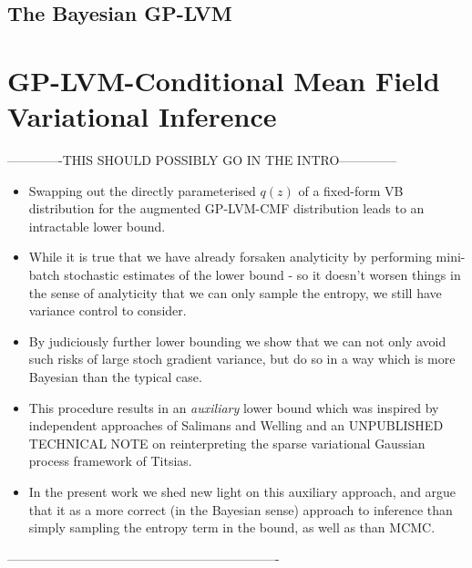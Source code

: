 \documentclass{article}
\begin{document}
\subsection{The Bayesian GP-LVM}
\label{subsec:gplvm}

\section{GP-LVM-Conditional Mean Field Variational Inference} %
\label{sec:gplvmcmf}

-------------THIS SHOULD POSSIBLY GO IN THE INTRO--------------

\begin{itemize}
  \item Swapping out the directly parameterised $q(z)$ of a fixed-form VB distribution for the augmented GP-LVM-CMF distribution leads to an intractable lower bound.
  \item While it is true that we have already forsaken analyticity by performing mini-batch stochastic estimates of the lower bound - so it doesn't worsen things in the sense of analyticity that we can only sample the entropy, we still have variance control to consider.
  \item By judiciously further lower bounding we show that we can not only avoid such risks of large stoch gradient variance, but do so in a way which is more Bayesian than the typical case.
  \item This procedure results in an \emph{auxiliary} lower bound which was inspired by independent approaches of Salimans and Welling and an UNPUBLISHED TECHNICAL NOTE on reinterpreting the sparse variational Gaussian process framework of Titsias.
  \item In the present work we shed new light on this auxiliary approach, and argue that it as a more correct (in the Bayesian sense) approach to inference than simply sampling the entropy term in the bound, as well as than MCMC.
\end{itemize}

----------------------------------------------------------------
\end{document}
